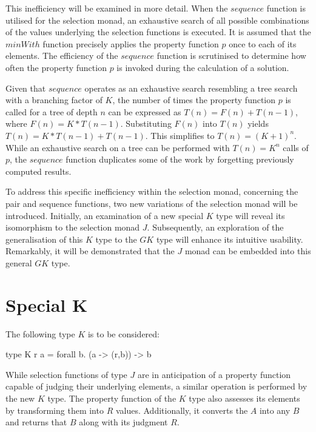 \documentclass[runningheads]{llncs}
\begin{document}
This inefficiency will be examined in more detail. When the \(sequence\)
function is utilised for the selection monad, an exhaustive search of
all possible combinations of the values underlying the selection
functions is executed. It is assumed that the \(minWith\) function
precisely applies the property function \(p\) once to each of its
elements. The efficiency of the \(sequence\) function is scrutinised to
determine how often the property function \(p\) is invoked during the
calculation of a solution.

Given that \(sequence\) operates as an exhaustive search resembling a
tree search with a branching factor of \(K\), the number of times the
property function \(p\) is called for a tree of depth \(n\) can be
expressed as \(T(n) = F(n) + T(n-1)\), where \(F(n) = K * T(n-1)\).
Substituting \(F(n)\) into \(T(n)\) yields
\(T(n) = K * T(n-1) + T(n-1)\). This simplifies to \(T(n) = (K + 1)^n\).
While an exhaustive search on a tree can be performed with
\(T(n) = K^n\) calls of \(p\), the \(sequence\) function duplicates some
of the work by forgetting previously computed results.

To address this specific inefficiency within the selection monad,
concerning the pair and sequence functions, two new variations of the
selection monad will be introduced. Initially, an examination of a new
special \(K\) type will reveal its isomorphism to the selection monad
\(J\). Subsequently, an exploration of the generalisation of this \(K\)
type to the \(GK\) type will enhance its intuitive usability.
Remarkably, it will be demonstrated that the \(J\) monad can be embedded
into this general \(GK\) type.

\section{Special K}\label{special-k}

The following type \(K\) is to be considered:

\begin{code}
type K r a = forall b. (a -> (r,b)) -> b
\end{code}

While selection functions of type \(J\) are in anticipation of a
property function capable of judging their underlying elements, a
similar operation is performed by the new \(K\) type. The property
function of the \(K\) type also assesses its elements by transforming
them into \(R\) values. Additionally, it converts the \(A\) into any
\(B\) and returns that \(B\) along with its judgment \(R\).
\end{document}
